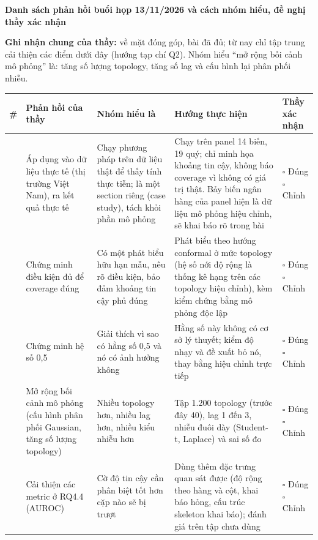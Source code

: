 \documentclass[9pt,landscape,a4paper]{extarticle}
\begin{document}
{\large\textbf{Danh sách phản hồi buổi họp 13/11/2026 và cách nhóm hiểu, đề nghị thầy xác nhận}}\par\vspace{3pt}
{\small \textbf{Ghi nhận chung của thầy:} về mặt đóng góp, bài đã đủ; từ nay chỉ tập trung cải thiện các điểm dưới đây (hướng tạp chí Q2). Nhóm hiểu ``mở rộng bối cảnh mô phỏng'' là: tăng số lượng topology, tăng số lag và cấu hình lại phân phối nhiễu.}\par\vspace{4pt}
\begin{tabularx}{\textwidth}{|>{\centering\arraybackslash}p{0.5cm}|>{\raggedright\arraybackslash}p{4.6cm}|>{\raggedright\arraybackslash}p{5.2cm}|>{\raggedright\arraybackslash}X|>{\raggedright\arraybackslash}p{1.9cm}|}
\hline
\textbf{\#} & \textbf{Phản hồi của thầy} & \textbf{Nhóm hiểu là} & \textbf{Hướng thực hiện} & \textbf{Thầy xác nhận}\\ \hline
1 & Áp dụng vào dữ liệu thực tế (thị trường Việt Nam), ra kết quả thực tế & Chạy phương pháp trên dữ liệu thật để thấy tính thực tiễn; là một section riêng (case study), tách khỏi phần mô phỏng & Chạy trên panel 14 biến, 19 quý; chỉ minh họa khoảng tin cậy, không báo coverage vì không có giá trị thật. Bảy biến ngân hàng của panel hiện là dữ liệu mô phỏng hiệu chỉnh, sẽ khai báo rõ trong bài & $\square$ Đúng\newline$\square$ Chỉnh \\ \hline
2 & Chứng minh điều kiện đủ để coverage đúng & Có một phát biểu hữu hạn mẫu, nêu rõ điều kiện, bảo đảm khoảng tin cậy phủ đúng & Phát biểu theo hướng conformal ở mức topology (hệ số nới độ rộng là thống kê hạng trên các topology hiệu chỉnh), kèm kiểm chứng bằng mô phỏng độc lập & $\square$ Đúng\newline$\square$ Chỉnh \\ \hline
3 & Chứng minh hệ số 0,5 & Giải thích vì sao có hằng số 0,5 và nó có ảnh hưởng không & Hằng số này không có cơ sở lý thuyết; kiểm độ nhạy và đề xuất bỏ nó, thay bằng hiệu chỉnh trực tiếp & $\square$ Đúng\newline$\square$ Chỉnh \\ \hline
4 & Mở rộng bối cảnh mô phỏng (cấu hình phân phối Gaussian, tăng số lượng topology) & Nhiều topology hơn, nhiều lag hơn, nhiều kiểu nhiễu hơn & Tập 1.200 topology (trước đây 40), lag 1 đến 3, nhiễu đuôi dày (Student-t, Laplace) và sai số đo & $\square$ Đúng\newline$\square$ Chỉnh \\ \hline
5 & Cải thiện các metric ở RQ4.4 (AUROC) & Cờ độ tin cậy cần phân biệt tốt hơn cặp nào sẽ bị trượt & Dùng thêm đặc trưng quan sát được (độ rộng theo hàng và cột, khai báo hỏng, cấu trúc skeleton khai báo); đánh giá trên tập chưa dùng & $\square$ Đúng\newline$\square$ Chỉnh \\ \hline

\end{tabularx}
\end{document}
